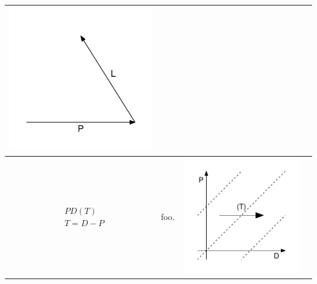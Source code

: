 \documentclass[
  12pt
]{scrartcl}
\begin{document}
\begin{center}
\begin{longtable}{m{}m{}m{}m{}}
  \includegraphics[width = \linewidth]{../fig/LP_iso.pdf}  \\
  \midrule
  $$\begin{aligned}
    &PD(T) \\
    &T = D - P
  \end{aligned}$$ &
  foo. &
  \includegraphics[width = \linewidth]{../fig/PDt.pdf} &

\end{longtable}
\end{center}
\end{document}
